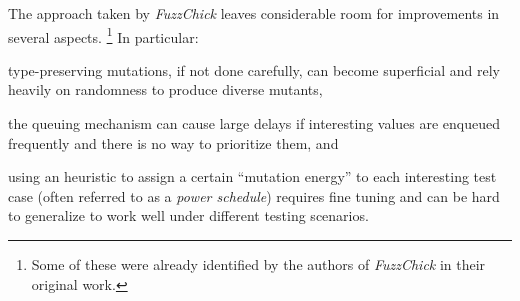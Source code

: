 \documentclass[sigconf, anonymous]{acmart}
\newcommand{\fuzzchick}{\textit{FuzzChick}\xspace}
\begin{document}
%
%
%
%
The approach taken by \fuzzchick leaves considerable room for
improvements in several aspects.%
\footnote{Some of these were already identified by the authors of \fuzzchick in
  their original work.}
%
In particular:
%
\begin{inparaenum}
\item type-preserving mutations, if not done carefully, can become superficial
  and rely heavily on randomness to produce diverse mutants,
\item the queuing mechanism can cause large delays if interesting values are
  enqueued frequently and there is no way to prioritize them, and
\item using an heuristic to assign a certain ``mutation energy'' to each
  interesting test case (often referred to as a \emph{power schedule}) requires
  fine tuning and can be hard to generalize to work well under different testing
  scenarios.
\end{inparaenum}
%
\end{document}
